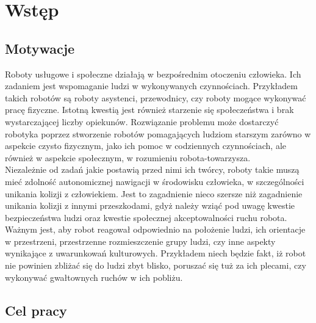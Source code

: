 \chapter{Wstęp}

\section{Motywacje}

\indent Roboty usługowe i społeczne działają w bezpośrednim otoczeniu człowieka. Ich zadaniem jest wspomaganie ludzi w wykonywanych czynnościach. Przykładem takich robotów są roboty asystenci, przewodnicy, czy roboty mogące wykonywać pracę fizyczne. Istotną kwestią jest również starzenie się społeczeństwa i brak wystarczającej liczby opiekunów. Rozwiązanie problemu może dostarczyć robotyka poprzez stworzenie robotów pomagających ludziom starszym zarówno w aspekcie czysto fizycznym, jako ich pomoc w codziennych czynnościach, ale również w aspekcie społecznym, w rozumieniu robota-towarzysza. \\
\indent Niezależnie od zadań jakie postawią przed nimi ich twórcy, roboty takie muszą mieć zdolność autonomicznej nawigacji w środowisku człowieka, w szczególności unikania kolizji z człowiekiem. Jest to zagadnienie nieco szersze niż zagadnienie unikania kolizji z innymi przeszkodami, gdyż należy wziąć pod uwagę kwestie bezpieczeństwa ludzi oraz kwestie społecznej akceptowalności ruchu robota. Ważnym jest, aby robot reagował odpowiednio na położenie ludzi, ich orientacje w przestrzeni, przestrzenne rozmieszczenie grupy ludzi, czy inne aspekty wynikające z uwarunkowań kulturowych. Przykładem niech będzie fakt, iż robot nie powinien zbliżać się do ludzi zbyt blisko, poruszać się tuż za ich plecami, czy wykonywać gwałtownych ruchów w ich pobliżu.

\section{Cel pracy}

